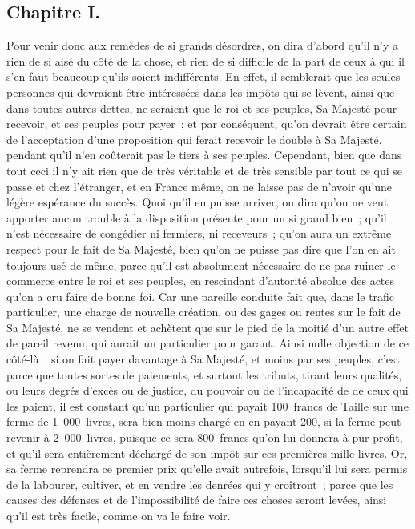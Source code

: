 \documentclass[french,twoside]{book} %
\begin{document}
\subsection[{Chapitre I.}]{Chapitre I.}
\noindent Pour venir donc aux remèdes de si grands désordres, on dira d’abord qu’il n’y a rien de si aisé du côté de la chose, et rien de si difficile de la part de ceux à qui il s’en faut beaucoup qu’ils soient indifférents. En effet, il semblerait que les seules personnes qui devraient être intéressées dans les impôts qui se lèvent, ainsi que dans toutes autres dettes, ne seraient que le roi et ses peuples, Sa Majesté pour recevoir, et ses peuples pour payer ; et par conséquent, qu’on devrait être certain de l’acceptation d’une proposition qui ferait recevoir le double à Sa Majesté, pendant qu’il n’en coûterait pas le tiers à ses peuples. Cependant, bien que dans tout ceci il n’y ait rien que de très véritable et de très sensible par tout ce qui se passe et chez l’étranger, et en France même, on ne laisse pas de n’avoir qu’une légère espérance du succès. Quoi qu’il en puisse arriver, on dira qu’on ne veut apporter aucun trouble à la disposition présente pour un si grand bien ; qu’il n’est nécessaire de congédier ni fermiers, ni receveurs ; qu’on aura un extrême respect pour le fait de Sa Majesté, bien qu’on ne puisse pas dire que l’on en ait toujours usé de même, parce qu’il est absolument nécessaire de ne pas ruiner le commerce entre le roi et ses peuples, en rescindant d’autorité absolue des actes qu’on a cru faire de bonne foi. Car une pareille conduite fait que, dans le trafic particulier, une charge de nouvelle création, ou des gages ou rentes sur le fait de Sa Majesté, ne se vendent et achètent que sur le pied de la moitié d’un autre effet de pareil revenu, qui aurait un particulier pour garant. Ainsi nulle objection de ce côté-là : si on fait payer davantage à Sa Majesté, et moins par ses peuples, c’est parce que toutes sortes de paiements, et surtout les tributs, tirant leurs qualités, ou leurs degrés d’excès ou de justice, du pouvoir ou de l’incapacité de de ceux qui les paient, il est constant qu’un particulier qui payait 100 francs de Taille sur une ferme de 1 000 livres, sera bien moins chargé en en payant 200, si la ferme peut revenir à 2 000 livres, puisque ce sera 800 francs qu’on lui donnera à pur profit, et qu’il sera entièrement déchargé de son impôt sur ces premières mille livres. Or, sa ferme reprendra ce premier prix qu’elle avait autrefois, lorsqu’il lui sera permis de la labourer, cultiver, et en vendre les denrées qui y croîtront ; parce que les causes des défenses et de l’impossibilité de faire ces choses seront levées, ainsi qu’il est très facile, comme on va le faire voir.
\end{document}
